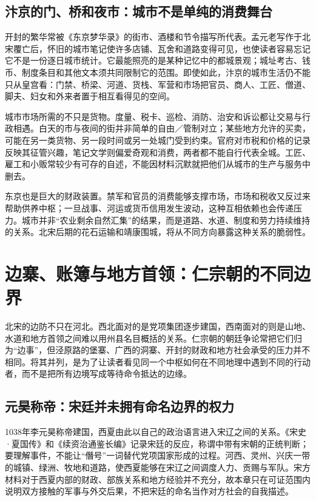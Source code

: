 \subsection{汴京的门、桥和夜市：城市不是单纯的消费舞台}

开封的繁华常被《东京梦华录》的街市、酒楼和节令描写所代表。孟元老写作于北宋覆亡后，怀旧的城市笔记使许多店铺、瓦舍和道路变得可见，也使读者容易忘记它不是一份逐日城市统计。它最能照亮的是某种记忆中的都城景观；城址考古、钱币、制度条目和其他文本须共同限制它的范围。即使如此，汴京的城市生活仍不能只从皇宫看：门禁、桥梁、河道、货栈、军营和市场把官员、商人、工匠、僧道、脚夫、妇女和外来者置于相互看得见的空间。

城市市场所需的不只是货物。度量、税卡、巡检、消防、治安和诉讼都让交易与行政相遇。白天的市与夜间的街并非简单的自由／管制对立；某些地方允许的买卖，可能在另一类货物、另一段时间或另一处城门受到约束。官府对市税和价格的记录反映其征管兴趣，笔记文学则偏爱奇观和消费，两者都不能自行代表全城。工匠、雇工和小贩常较少有可存的自述，不能因材料沉默就把他们从城市的生产与服务中删去。

东京也是巨大的财政装置。禁军和官员的消费能够支撑市场，市场和税收又反过来帮助供养中枢；一旦战事、河运或货币信用发生波动，这种互相依赖也会传递压力。城市并非“农业剩余自然汇集”的结果，而是道路、水道、制度和劳力持续维持的关系。北宋后期的花石运输和靖康围城，将从不同方向暴露这种关系的脆弱性。

\section{边寨、账簿与地方首领：仁宗朝的不同边界}

北宋的边防不只在河北。西北面对的是党项集团逐步建国，西南面对的则是山地、水道和地方首领之间难以用州县名目概括的关系。仁宗朝的朝廷争论常把它们归为“边事”，但泾原路的堡寨、广西的洞寨、开封的财政和地方社会承受的压力并不相同。将其并列，是为了让读者看见同一个中枢如何在不同地理中遇到不同的行动者，而不是把所有边境写成等待命令抵达的边缘。

\subsection{元昊称帝：宋廷并未拥有命名边界的权力}

1038年李元昊称帝建国，西夏由此以自己的政治语言进入宋辽之间的关系。《宋史·夏国传》和《续资治通鉴长编》记录宋廷的反应，称谓中带有宋朝的正统判断；要理解事件，不能让“僭号”一词替代党项国家形成的过程。河西、灵州、兴庆一带的城镇、绿洲、牧地和道路，使西夏能够在宋辽之间调度人力、贡赐与军队。宋方材料对于西夏内部的财政、部族关系和地方经验并不充分，故本章只在可证范围内说明双方接触的军事与外交后果，不把宋廷的命名当作对方社会的自我描述。

